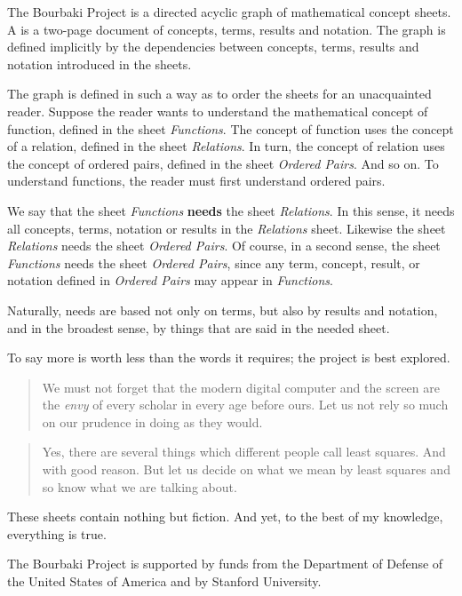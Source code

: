 
\sbasic

\sstart
{}

The Bourbaki Project is a directed acyclic graph of
mathematical concept sheets.
A  is a two-page document of
concepts, terms, results and notation.
The graph is defined implicitly by
the dependencies between concepts, terms,
results and notation introduced in the sheets.

The graph is defined in such a way as to
order the sheets for an unacquainted reader.
Suppose the reader wants to understand the
mathematical concept of function, defined
in the sheet \textit{Functions}.
The concept of function uses the concept of a
relation,
defined in the sheet \textit{Relations}.
In turn, the concept of relation uses the
concept of ordered pairs, defined in
the sheet \textit{Ordered Pairs}.
And so on.
To understand functions, the reader must
first understand ordered pairs.

We say that the sheet \textit{Functions}
\textbf{needs} the sheet \textit{Relations}.
In this sense, it needs all concepts,
terms, notation or results in the
\textit{Relations} sheet.
Likewise the sheet \textit{Relations}
needs the sheet \textit{Ordered Pairs}.
Of course, in a second sense, the sheet
\textit{Functions} needs the sheet
\textit{Ordered Pairs},
since any term, concept,
result, or notation defined in
\textit{Ordered Pairs} may appear in
\textit{Functions}.

Naturally, needs are based not only
on terms, but also by results and notation,
and in the broadest sense, by things that are said in the
needed sheet.
\clearpage

To say more is worth less than the words it requires;
the project is best explored.

\begin{quote}
We must not forget that the
modern digital computer and
the screen are the \textit{envy} of
every scholar in every age
before ours. Let us not rely
so much
on our prudence in doing
as they would.
\end{quote}

\begin{quote}
Yes, there are several things
which different people call
least squares. And with good
reason. But let us decide on
what we mean by least squares
and so know what we are talking
about.
\end{quote}

These sheets contain nothing
but fiction. And yet, to the best
of my knowledge, everything
is true.

The Bourbaki Project is supported by
funds from the Department of
Defense of the United States of America
and by Stanford University.
\strats
